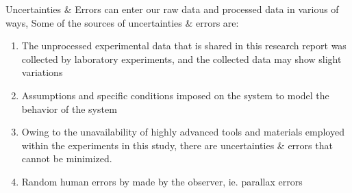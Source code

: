 {Uncertainties \& Errors can enter our raw data and processed data in various of ways, Some of the sources of uncertainties \& errors are:}
      
      \begin{enumerate}
          \item {The unprocessed experimental data that is shared in this research report was collected by laboratory experiments, and the collected data may show slight variations}
          \item {Assumptions and specific conditions imposed on the system to model the behavior of the system}          
          \item {Owing to the unavailability of highly advanced tools and materials employed within the experiments in this study, there are uncertainties \& errors that cannot be minimized.}          
          \item {Random human errors by made by the observer, ie. parallax errors}
      \end{enumerate}

